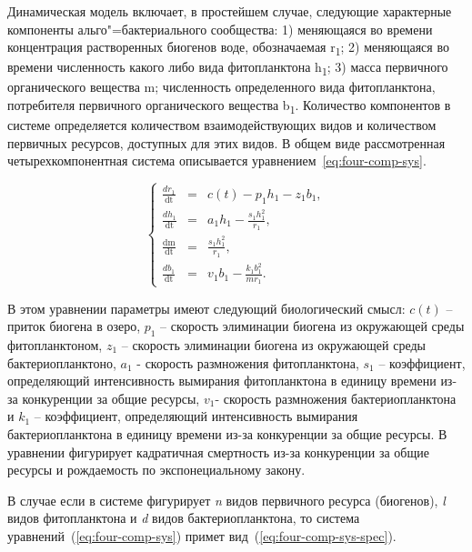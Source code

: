 \documentclass[a4paper,12pt,openany,final]{extreport}
\begin{document}
Динамическая модель включает, в простейшем случае, следующие характерные компоненты альго"=бактериального сообщества: 1) меняющаяся во времени концентрация растворенных биогенов воде, обозначаемая r\textsubscript{1}; 2) меняющаяся во времени численность какого либо вида фитопланктона h\textsubscript{1}; 3) масса первичного органического вещества m; численность определенного вида фитопланктона, потребителя первичного органического вещества b\textsubscript{1}. Количество компонентов в системе определяется количеством взаимодействующих видов и количеством первичных ресурсов, доступных для этих видов. В общем виде рассмотренная четырехкомпонентная система описывается уравнением~\ref{eq:four-comp-sys}.

\begin{equation}
\left\{ \begin{array}{lcl}
\frac{dr_{1}}{\text{dt}} &=& c\left( t \right) - p_{1}h_{1} - z_{1}b_{1},\\
\frac{dh_{1}}{\text{dt}} &=& a_{1}h_{1} - \frac{s_{1}h_{1}^{2}}{r_{1}},\\
\frac{\text{dm}}{\text{dt}} &=& \frac{s_{1}h_{1}^{2}}{r_{1}},\\
\frac{db_{1}}{\text{dt}} &=& v_{1}b_{1} - \frac{k_{1}b_{1}^{2}}{mr_{1}}.
\end{array} \right. \label{eq:four-comp-sys}
\end{equation}

В этом уравнении параметры имеют следующий биологический смысл: \(c(t)\) --
приток биогена в озеро, \(p_{1}\) -- скорость элиминации биогена из
окружающей среды фитопланктоном, \(z_{1}\) -- скорость элиминации
биогена из окружающей среды бактериопланктоно, \(a_{1}\) - скорость
размножения фитопланктона, \(s_{1}\) -- коэффициент, определяющий
интенсивность вымирания фитопланктона в единицу времени из-за
конкуренции за общие ресурсы, \(v_1\)- скорость размножения бактериопланктона и
\(k_{1}\) -- коэффициент, определяющий интенсивность вымирания
бактериопланктона в единицу времени из-за конкуренции за общие ресурсы.
В уравнении фигурирует кадратичная смертность из-за конкуренции за общие
ресурсы и рождаемость по экспонециальному закону.

В случае если в системе фигурирует \emph{n} видов первичного ресурса
(биогенов), \emph{l} видов фитопланктона и \emph{d} видов
бактериопланктона, то система уравнений~(\ref{eq:four-comp-sys}) примет вид~(\ref{eq:four-comp-sys-spec}).
\end{document}
